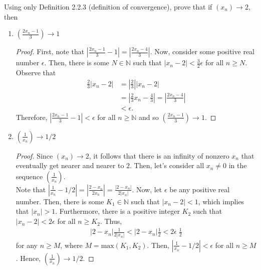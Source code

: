 \documentclass[12pt]{article}
\newcommand{\N}{\mathbb{N}}
\newcommand{\Abs}[1]{\left\vert #1 \right\vert}
\newenvironment{problem}[2][Problem]{\begin{trivlist} \item[\hskip \labelsep {\bfseries #1}\hskip \labelsep {\bfseries #2.}]}{\end{trivlist}}
\begin{document}
    \begin{problem}{2.3.2}
      Using only Definition 2.2.3 (definition of convergence), prove that if $(x_{n})\to 2$, then 
    \begin{enumerate}
      \item $\left( \frac{2x_{n}-1}{3} \right)\to 1$
    \begin{proof}
      First, note that $\Abs{\frac{2x_{n}-1}{3}-1} = \Abs{\frac{2x_{n}-4}{3}}$. Now, consider some positive real number $\epsilon$. Then, there is some $N\in \N$ such that $\Abs{x_{n}-2}<\frac{3}{2} \epsilon$ for all $n\geq N$. Observe that
    \begin{align*}
    \frac{2}{3}\Abs{x_{n}-2} &= \Abs{\frac{2}{3}}\Abs{x_{n}-2}\\
  &= \Abs{\frac{2}{3}x_{n}-\frac{4}{3}} = \Abs{\frac{2x_{n}-4}{3}}\\
  &< \epsilon.
    \end{align*}
    Therefore, $\Abs{\frac{2x_{n}-1}{3}-1}<\epsilon$ for all $n\geq \N$ and so $\left( \frac{2x_{n}-1}{3} \right)\to 1$. 
    \end{proof}
      \item $\left( \frac{1}{x_{n}} \right)\to 1/2$
    \begin{proof}
      Since $(x_{n})\to 2$, it follows that there is an infinity of nonzero $x_{n}$ that eventually get nearer and nearer to $2$. Then, let's consider all $x_{n} \neq 0$ in the sequence $\left( \frac{1}{x_{n}} \right)$. \\
      Note that $\Abs{\frac{1}{x_{n}}-1/2} = \Abs{\frac{2-x_{n}}{2x_{n}}} = \frac{\Abs{2-x_{n}}}{2\Abs{x_{n}}}$. Now, let $\epsilon$ be any positive real number. Then, there is some $K_{1}\in \N$ such that $|x_{n}-2| < 1$, which implies that $|x_{n}| > 1$. Furthermore, there is a positive integer $K_{2}$ such that $|x_{n}-2| < 2\epsilon$ for all $n\geq K_{2}$. Thus, 
    \begin{align*}
      \Abs{2-x_{n}}\frac{1}{2|x_{n}|} < \Abs{2-x_{n}}\frac{1}{2} < 2\epsilon\;\frac{1}{2} 
    \end{align*}
    for any $n\geq M$, where $M=\mathrm{max}(K_{1},K_{2})$. Then, $\Abs{\frac{1}{x_{n}}-1/2}<\epsilon$ for all $n\geq M$. Hence, $\left( \frac{1}{x_{n}} \right)\to 1/2$.
    \end{proof}
    \end{enumerate}
    \end{problem}
\end{document}
